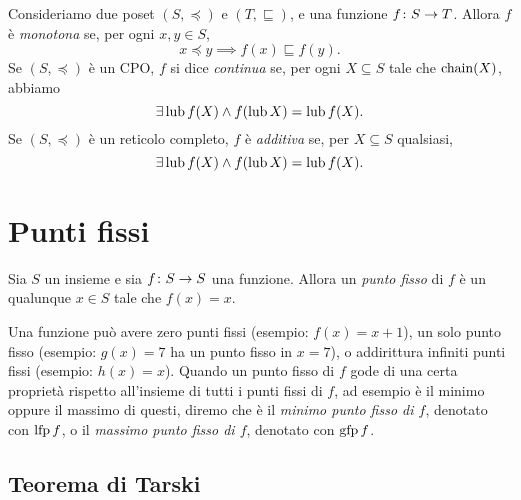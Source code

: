 \begin{definizione} 
Consideriamo due poset $(S, \preceq)$ e $(T, \sqsubseteq)$,
e una funzione $\mathord{f}\colon S\to T$.
Allora
$f$ è \emph{monotona} se, per ogni $x, y \in S$,
\[
  x \preceq y \implies f(x) \sqsubseteq f(y).
\]
Se $(S, \preceq)$ \`e un CPO,
$f$ si dice \emph{continua} se, per ogni $X \subseteq S$ tale che $\mathop{\mathrm{chain}}\nolimits(X)$,
abbiamo
\[
  \exists \mathop{\mathrm{lub}}\nolimits f(X) \land f(\mathop{\mathrm{lub}}\nolimits X) = \mathop{\mathrm{lub}}\nolimits f(X).
\]
Se $(S, \preceq)$ \`e un reticolo completo,
$f$ è \emph{additiva} se, per $X \subseteq S$ qualsiasi,
\[
  \exists \mathop{\mathrm{lub}}\nolimits f(X) \land f(\mathop{\mathrm{lub}}\nolimits X) = \mathop{\mathrm{lub}}\nolimits f(X).
\]
\end{definizione}


\section{Punti fissi}

\begin{definizione} 
Sia $S$ un insieme e sia $\mathord{f}\colon S\to S$ una funzione.
Allora un \emph{punto fisso} di $f$ è un qualunque $x \in S$ tale
che $f(x) = x$.
\end{definizione}

Una funzione può avere zero punti fissi (esempio: $f(x) = x+1$),
un solo punto fisso
(esempio: $g(x) = 7$ ha un punto fisso in $x=7$),
o addirittura infiniti punti fissi (esempio: $h(x) = x$).
Quando un punto fisso di $f$ gode di una certa proprietà rispetto
all'insieme di tutti i punti fissi di $f$, ad esempio è il minimo
oppure il massimo di questi, diremo che è il
\emph{minimo punto fisso di $f$}, denotato con $\mathop{\mathrm{lfp}}\nolimits f$,
o il \emph{massimo punto fisso di $f$}, denotato con $\mathop{\mathrm{gfp}}\nolimits f$.

\subsection{Teorema di Tarski}

